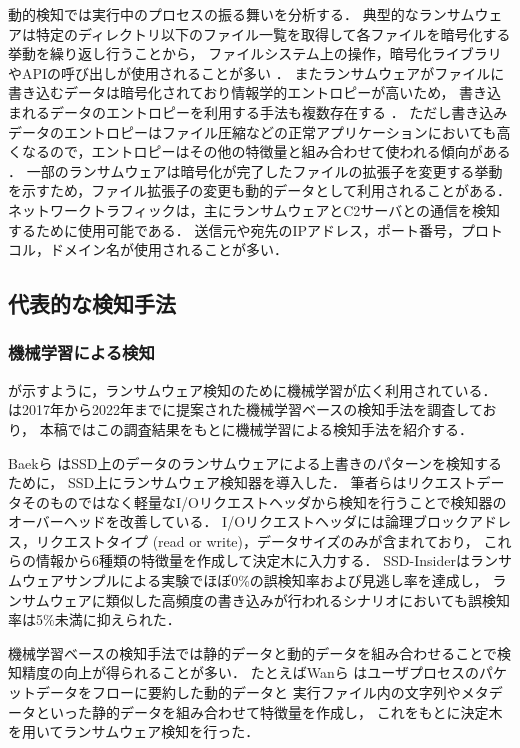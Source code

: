 動的検知では実行中のプロセスの振る舞いを分析する．
典型的なランサムウェアは特定のディレクトリ以下のファイル一覧を取得して各ファイルを暗号化する挙動を繰り返し行うことから，
ファイルシステム上の操作，暗号化ライブラリやAPIの呼び出しが使用されることが多い \cite{Evolution-Ransomware}．
またランサムウェアがファイルに書き込むデータは暗号化されており情報学的エントロピーが高いため，
書き込まれるデータのエントロピーを利用する手法も複数存在する \cite{kharaz2016unveil,kharraz2017redemption}．
ただし書き込みデータのエントロピーはファイル圧縮などの正常アプリケーションにおいても高くなるので，エントロピーはその他の特徴量と組み合わせて使われる傾向がある \cite{berrueta2019survey}．
一部のランサムウェアは暗号化が完了したファイルの拡張子を変更する挙動を示すため，ファイル拡張子の変更も動的データとして利用されることがある\cite{medhat2018new}．
ネットワークトラフィックは，主にランサムウェアとC2サーバとの通信を検知するために使用可能である．
送信元や宛先のIPアドレス，ポート番号，プロトコル，ドメイン名が使用されることが多い\cite{Evolution-Ransomware}．

\subsection{代表的な検知手法}
\subsubsection{機械学習による検知}
が示すように，ランサムウェア検知のために機械学習が広く利用されている．
\cite{alraizza2023ransomware}は2017年から2022年までに提案された機械学習ベースの検知手法を調査しており，
本稿ではこの調査結果をもとに機械学習による検知手法を紹介する．

Baekら \cite{baek2018ssd} はSSD上のデータのランサムウェアによる上書きのパターンを検知するために，
SSD上にランサムウェア検知器を導入した．
筆者らはリクエストデータそのものではなく軽量なI/Oリクエストヘッダから検知を行うことで検知器のオーバーヘッドを改善している．
I/Oリクエストヘッダには論理ブロックアドレス，リクエストタイプ (read or write)，データサイズのみが含まれており，
これらの情報から6種類の特徴量を作成して決定木に入力する．
SSD-Insiderはランサムウェアサンプルによる実験でほぼ0\%の誤検知率および見逃し率を達成し，
ランサムウェアに類似した高頻度の書き込みが行われるシナリオにおいても誤検知率は5\%未満に抑えられた．

機械学習ベースの検知手法では静的データと動的データを組み合わせることで検知精度の向上が得られることが多い\cite{alraizza2023ransomware}．
たとえばWanら \cite{wan2018feature}はユーザプロセスのパケットデータをフローに要約した動的データと
実行ファイル内の文字列やメタデータといった静的データを組み合わせて特徴量を作成し，
これをもとに決定木を用いてランサムウェア検知を行った．


